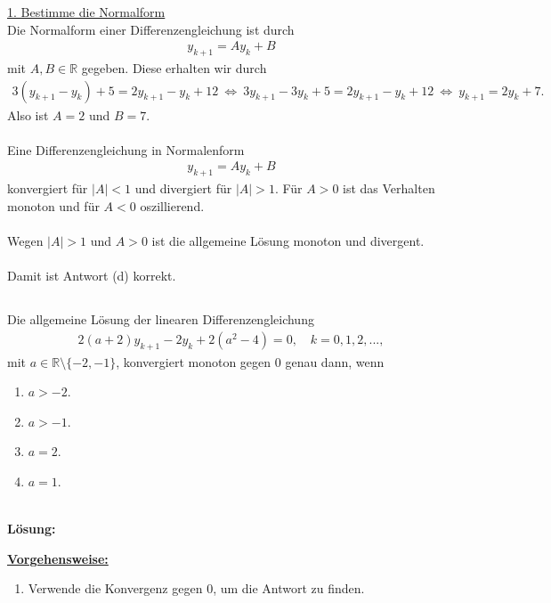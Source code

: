 \underline{1. Bestimme die Normalform}\\
Die Normalform einer Differenzengleichung ist durch
\begin{align*}
y_{k+1} = A y_{k} + B
\end{align*}
mit $ A, B \in \mathbb{R} $ gegeben.
Diese erhalten wir durch
\begin{align*}
3 (y_{k+1}   -y_k  )+ 5 = 2 y_{k+1} -y_k + 12 
\ \Leftrightarrow \
3 y_{k+1} - 3 y_k + 5  = 2 y_{k+1} - y_k +12 
\ \Leftrightarrow \
y_{k+1} = 2 y_k + 7.
\end{align*}
Also ist $ A = 2$ und $ B= 7 $. \\
\\
Eine Differenzengleichung in Normalenform
\begin{align*}
y_{k+1} = A y_{k} + B
\end{align*}
konvergiert für $ |A| < 1 $ und divergiert für $ |A| > 1 $.
Für $ A> 0 $ ist das Verhalten monoton und für $  A < 0 $ oszillierend.\\
\\ 
Wegen $ |A |> 1  $ und $ A > 0  $ ist die allgemeine Lösung monoton und divergent.\\
\\
Damit ist Antwort (d) korrekt.

\newpage

\subsection*{}
Die allgemeine Lösung der linearen Differenzengleichung
\begin{align*}
2 (a + 2) y_{k+1} - 2 y_k + 2 (a^2 - 4) = 0, \quad k = 0,1,2,...,
\end{align*}
mit $ a \in \mathbb{R} \setminus \{-2,-1  \} $, konvergiert monoton gegen $ 0 $ genau dann, wenn
\renewcommand{\labelenumi}{(\alph{enumi})}
\begin{enumerate}
	\item 
	$ a > -2 $.
	\item
	$a > -1$.
	\item
	$ a = 2 $.
	\item
	$ a = 1 $.
\end{enumerate}
\ \\
\textbf{Lösung:}
\begin{mdframed}
\underline{\textbf{Vorgehensweise:}}
\renewcommand{\labelenumi}{\theenumi.}
\begin{enumerate}
\item Verwende die Konvergenz gegen $ 0 $, um die Antwort zu finden.
\end{enumerate}
\end{mdframed}

